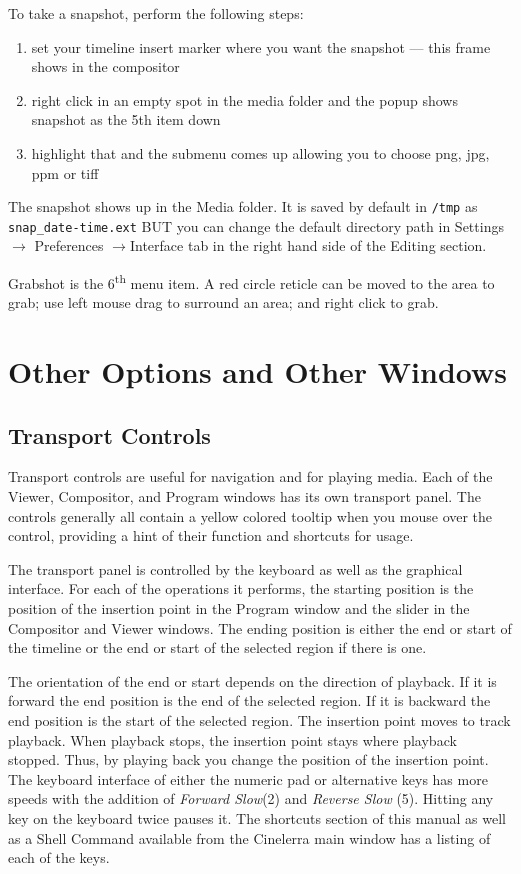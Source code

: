 To take a snapshot, perform the following steps:

\begin{enumerate}
    \item set your timeline insert marker where you want the snapshot --- this frame shows in the compositor
    \item  right click in an empty spot in the media folder and the popup shows snapshot as the 5th item down
    \item  highlight that and the submenu comes up allowing you to choose png, jpg, ppm or tiff
\end{enumerate}

The snapshot shows up in the Media folder.  
It is saved by default in \texttt{/tmp} as \texttt{snap\_date-time.ext} BUT you can change the default directory path in Settings $\rightarrow$ Preferences $\rightarrow$Interface tab in the right hand side of the Editing section.

Grabshot is the 6\textsuperscript{th} menu item.  
A red circle reticle can be moved to the area to grab; use left mouse drag to surround an area; and right click to grab.




\section{Other Options and Other Windows}%
\label{sec:other_options_and_other_windows}

\subsection{Transport Controls}%
\label{sub:transport_controls}

Transport controls are useful for navigation and for playing media.  
Each of the Viewer, Compositor, and Program windows has its own transport panel.  
The controls generally all contain a yellow colored tooltip when you mouse over the control, providing a hint of their function and shortcuts for usage.

The transport panel is controlled by the keyboard as well as the graphical interface. 
For each of the operations it performs, the starting position is the position of the insertion point in the Program window and the slider in the Compositor and Viewer windows. 
The ending position is either the end or start of the timeline or the end or start of the selected region if there is one.

The orientation of the end or start depends on the direction of playback. 
If it is forward the end position is the end of the selected region. 
If it is backward the end position is the start of the selected region.  
The insertion point moves to track playback. 
When playback stops, the insertion point stays where playback stopped. 
Thus, by playing back you change the position of the insertion point. 
The keyboard interface of either the numeric pad or alternative keys has more speeds with the addition of \emph{Forward Slow}(2) and \emph{Reverse Slow} (5).  
Hitting any key on the keyboard twice pauses it. 
The shortcuts section of this manual as well as a Shell Command available from the Cinelerra main window has a listing of each of the keys.

